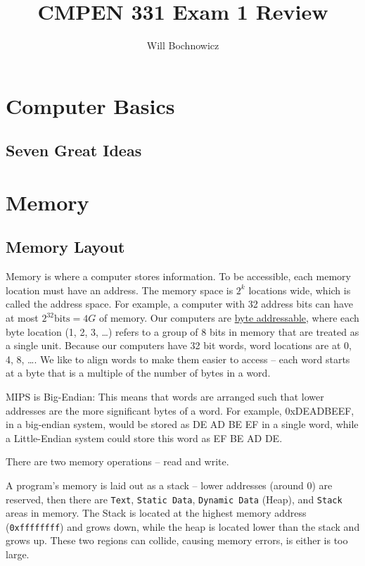 \documentclass{article}
\title{CMPEN 331 Exam 1 Review}
\author{Will Bochnowicz}
\begin{document}
\maketitle

\tableofcontents

\section{Computer Basics}

\subsection{Seven Great Ideas}

\section{Memory}

\subsection{Memory Layout}

Memory is where a computer stores information. To be accessible, each memory location must have an address. The memory space is $2^k$ locations wide, which is called the address space. For example, a computer with 32 address bits can have at most $2^{32} \text{bits} = 4G$ of memory. Our computers are \underline{byte addressable}, where each byte location (1, 2, 3, \ldots) refers to a group of 8 bits in memory that are treated as a single unit. Because our computers have 32 bit words, word locations are at 0, 4, 8, \ldots. We like to align words to make them easier to access -- each word starts at a byte that is a multiple of the number of bytes in a word.

MIPS is Big-Endian: This means that words are arranged such that lower addresses are the more significant bytes of a word. For example, 0xDEADBEEF, in a big-endian system, would be stored as DE AD BE EF in a single word, while a Little-Endian system could store this word as EF BE AD DE.

There are two memory operations -- read and write. 

A program's memory is laid out as a stack -- lower addresses (around 0) are reserved, then there are \texttt{Text}, \texttt{Static Data}, \texttt{Dynamic Data} (Heap), and \texttt{Stack} areas in memory. The Stack is located at the highest memory address (\texttt{0xffffffff}) and grows down, while the heap is located lower than the stack and grows up. These two regions can collide, causing memory errors, is either is too large. 
\end{document}
